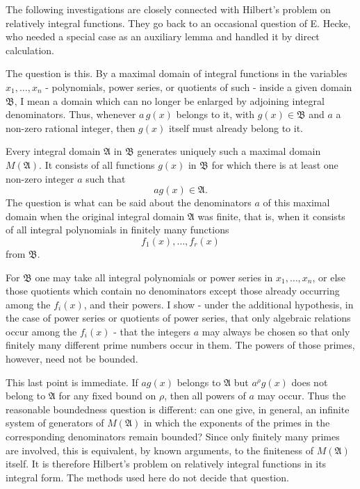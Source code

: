 \documentclass[
  11pt,
]{article}
\begin{document}
The following investigations are closely connected with Hilbert's
problem on relatively integral functions. They go back to an occasional
question of E. Hecke, who needed a special case as an auxiliary lemma
and handled it by direct calculation.

The question is this. By a maximal domain of integral functions in the
variables \(x_1,\ldots,x_n\) - polynomials, power series, or quotients
of such - inside a given domain \(\mathfrak B\), I mean a domain which
can no longer be enlarged by adjoining integral denominators. Thus,
whenever \(a\,g(x)\) belongs to it, with \(g(x)\in\mathfrak B\) and
\(a\) a non-zero rational integer, then \(g(x)\) itself must already
belong to it.

Every integral domain \(\mathfrak A\) in \(\mathfrak B\) generates
uniquely such a maximal domain \(M(\mathfrak A)\). It consists of all
functions \(g(x)\) in \(\mathfrak B\) for which there is at least one
non-zero integer \(a\) such that \[
  a g(x)\in\mathfrak A.
\] The question is what can be said about the denominators \(a\) of this
maximal domain when the original integral domain \(\mathfrak A\) was
finite, that is, when it consists of all integral polynomials in
finitely many functions \[
  f_1(x),\ldots,f_r(x)
\] from \(\mathfrak B\).

For \(\mathfrak B\) one may take all integral polynomials or power
series in \(x_1,\ldots,x_n\), or else those quotients which contain no
denominators except those already occurring among the \(f_i(x)\), and
their powers. I show - under the additional hypothesis, in the case of
power series or quotients of power series, that only algebraic relations
occur among the \(f_i(x)\) - that the integers \(a\) may always be
chosen so that only finitely many different prime numbers occur in them.
The powers of those primes, however, need not be bounded.

This last point is immediate. If \(a g(x)\) belongs to \(\mathfrak A\)
but \(a^\rho g(x)\) does not belong to \(\mathfrak A\) for any fixed
bound on \(\rho\), then all powers of \(a\) may occur. Thus the
reasonable boundedness question is different: can one give, in general,
an infinite system of generators of \(M(\mathfrak A)\) in which the
exponents of the primes in the corresponding denominators remain
bounded? Since only finitely many primes are involved, this is
equivalent, by known arguments, to the finiteness of \(M(\mathfrak A)\)
itself. It is therefore Hilbert's problem on relatively integral
functions in its integral form. The methods used here do not decide that
question.
\end{document}
